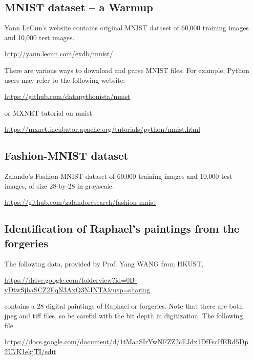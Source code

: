 \documentclass[11pt]{article}
\begin{document}
\subsection{MNIST dataset -- a Warmup}

Yann LeCun's website contains original MNIST dataset of 60,000 training images and 10,000 test images. 

\url{http://yann.lecun.com/exdb/mnist/}

There are various ways to download and parse MNIST files. For example, Python users may refer to the following website:

\url{https://github.com/datapythonista/mnist}

or MXNET tutorial on mnist

\url{https://mxnet.incubator.apache.org/tutorials/python/mnist.html}

\subsection{Fashion-MNIST dataset}

Zalando's Fashion-MNIST dataset of 60,000 training images and 10,000 test images, of size 28-by-28 in grayscale. 

\url{https://github.com/zalandoresearch/fashion-mnist}


\subsection{Identification of Raphael's paintings from the forgeries}

The following data, provided by Prof. Yang WANG from HKUST,

\url{https://drive.google.com/folderview?id=0B-yDtwSjhaSCZ2FqN3AxQ3NJNTA&usp=sharing}

\noindent contains a 28 digital paintings of Raphael or forgeries. Note that there are both jpeg and tiff files, so be careful with the bit depth in digitization. The following file

\url{https://docs.google.com/document/d/1tMaaSIrYwNFZZ2cEJdx1DfFscIfERd5Dp2U7K1ekjTI/edit}
\end{document}
